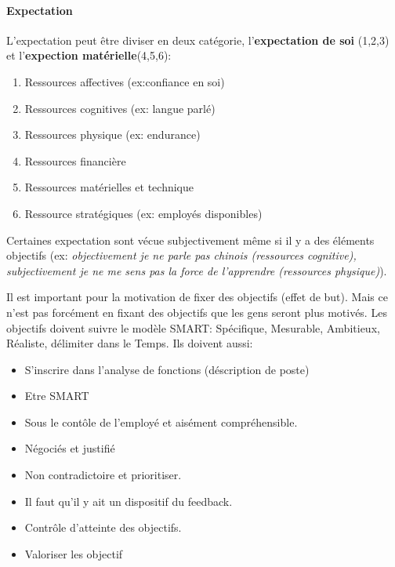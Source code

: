 \documentclass[11pt]{article} %
\begin{document}
		\paragraph{Expectation} L'expectation peut être diviser en deux catégorie, l'\textbf{expectation de soi}
		(1,2,3) et l'\textbf{expection matérielle}(4,5,6):
		\begin{multicols}{2}
			\begin{enumerate}
				\item Ressources affectives (ex:confiance en soi)
				\item Ressources cognitives (ex: langue parlé)
				\item Ressources physique (ex: endurance)
				\item Ressources financière
				\item Ressources matérielles et technique
				\item Ressource stratégiques (ex: employés disponibles)
			\end{enumerate}
		\end{multicols}

		Certaines expectation sont vécue subjectivement même si il y a des éléments objectifs (ex: \textit{objectivement je ne parle pas chinois (ressources cognitive), subjectivement je ne me sens pas la force de l'apprendre (ressources physique)}).

		Il est important pour la motivation de fixer des objectifs (effet de but). Mais ce n'est pas forcément en fixant des objectifs que les gens seront plus motivés. Les objectifs doivent suivre le modèle SMART:
		 Spécifique, Mesurable, Ambitieux, Réaliste, délimiter dans le Temps. Ils doivent aussi:
		 \begin{multicols}{2}
		 	\begin{itemize}
				\item S'inscrire dans l'analyse de fonctions (déscription de poste)
				\item Etre SMART
		 		\item Sous le contôle de l'employé et aisément compréhensible.
		 		\item Négociés et justifié
		 		\item Non contradictoire et prioritiser.
		 		\item Il faut qu'il y ait un dispositif du feedback.
		 		\item Contrôle d'atteinte des objectifs.
		 		\item Valoriser les objectif
		 	\end{itemize}
		 \end{multicols}
\end{document}
